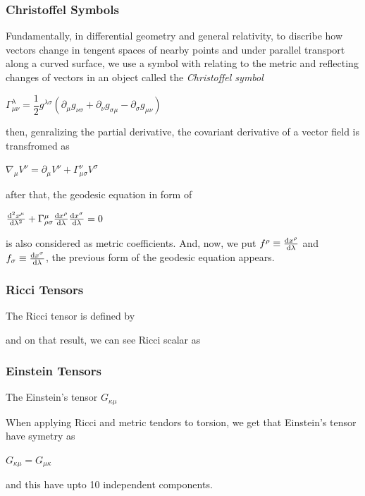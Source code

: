 \documentclass[11pt,a4paper]{article}
\begin{document}
	\subsubsection{Christoffel Symbols}
	Fundamentally, in differential geometry and general relativity, to discribe how vectors change in tengent spaces of nearby points and under parallel transport along a curved surface, we use a symbol with relating to the metric  and reflecting changes of vectors in an object called the \textit{Christoffel symbol}
	\begin{center}
		$\Gamma^{\lambda}_{\mu \nu} = \dfrac{1}{2} g^{\lambda \sigma} (\partial_{\mu}{g_{\nu \sigma}} + \partial_{\nu}{g_{\sigma \mu}}- \partial_{\sigma}{g_{\mu \nu}})$
	\end{center}
	then,  genralizing the partial derivative, the covariant derivative  of a vector field is transfromed as 
	\begin{center}
		$\nabla_{\mu} V^{\nu} = \partial_{\mu} V^{\nu} + \Gamma^{\nu}_{\mu \sigma} V^{\sigma}$
	\end{center} 
	after that, the geodesic equation in form of
	\begin{center}
		$\dv[2]{x^{\mu}}{\lambda} + \Gamma^{\mu}_{\rho \sigma} \dv{x^{\rho}}{\lambda} \dv{x^{\sigma}}{\lambda} = 0$
	\end{center}
	is also considered as metric coefficients. And, now, we put $f^{\rho} \equiv \dv{x^{\rho}}{\lambda}$ and $f_{\sigma} \equiv \dv{x^{\sigma}}{\lambda}$, the previous form of the geodesic equation appears.	
	\subsubsection{Ricci Tensors}
	The Ricci tensor is defined by
	\begin{center}
	\end{center}
	and on that result, we can see  Ricci scalar as
	\begin{center}
	\end{center}
	\subsubsection{Einstein Tensors}
	The Einstein's tensor $G_{\kappa \mu}$
	\begin{center}
	\end{center}
	When applying Ricci and metric tendors to torsion, we get that Einstein's tensor have symetry as
	\begin{center}
		$G_{\kappa \mu} = G_{\mu \kappa}$
	\end{center} 
	and this have upto 10 independent  components.
\end{document}
